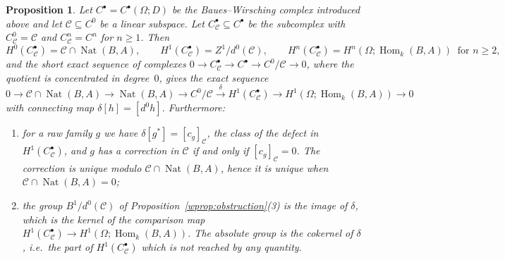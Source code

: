 \documentclass[11pt,a4paper]{article}
\theoremstyle{plain}
\newtheorem{proposition}[theorem]{Proposition}
\theoremstyle{definition}
\theoremstyle{remark}
\newcommand{\cat}[1]{\mathsf{#1}}
\newcommand{\catO}{\cat{\Omega}}
\DeclareMathOperator{\Nat}{Nat}
\DeclareMathOperator{\Hom}{Hom}
\begin{document}
\begin{proposition}\label{prop:relative}
Let $C^{\bullet} = C^{\bullet}(\catO;D)$ be the Baues--Wirsching complex
introduced above and let $\mathcal{C} \subseteq C^{0}$ be a linear subspace.
Let $C^{\bullet}_{\mathcal{C}} \subseteq C^{\bullet}$ be the subcomplex with
$C^{0}_{\mathcal{C}} = \mathcal{C}$ and $C^{n}_{\mathcal{C}} = C^{n}$ for
$n \ge 1$. Then
\[
H^{0}(C^{\bullet}_{\mathcal{C}}) = \mathcal{C} \cap \Nat(B,A),
\qquad
H^{1}(C^{\bullet}_{\mathcal{C}}) = Z^{1}/d^{0}(\mathcal{C}),
\qquad
H^{n}(C^{\bullet}_{\mathcal{C}}) = H^{n}(\catO;\Hom_k(B,A))
\ \text{ for } n \ge 2,
\]
and the short exact sequence of complexes
$0 \to C^{\bullet}_{\mathcal{C}} \to C^{\bullet} \to C^{0}/\mathcal{C} \to 0$,
where the quotient is concentrated in degree~$0$, gives the exact sequence
\begin{equation}\label{eq:relativeLES}
0 \to \mathcal{C} \cap \Nat(B,A) \to \Nat(B,A) \to C^{0}/\mathcal{C}
\xrightarrow{\ \delta\ } H^{1}(C^{\bullet}_{\mathcal{C}}) \to
H^{1}(\catO;\Hom_k(B,A)) \to 0
\end{equation}
with connecting map $\delta[h] = [d^{0}h]$. Furthermore:
\begin{enumerate}
\item for a raw family $g$ we have $\delta[g^{*}] = [c_g]_{\mathcal{C}}$, the
class of the defect in $H^{1}(C^{\bullet}_{\mathcal{C}})$, and $g$ has a
correction in $\mathcal{C}$ if and only if $[c_g]_{\mathcal{C}} = 0$. The
correction is unique modulo $\mathcal{C} \cap \Nat(B,A)$, hence it is unique
when $\mathcal{C} \cap \Nat(B,A) = 0$;
\item the group $B^{1}/d^{0}(\mathcal{C})$ of
Proposition~\ref{wprop:obstruction}(3) is the image of $\delta$, which is the
kernel of the comparison map
$H^{1}(C^{\bullet}_{\mathcal{C}}) \to H^{1}(\catO;\Hom_k(B,A))$. The absolute
group is the cokernel of $\delta$, i.e.\ the part of
$H^{1}(C^{\bullet}_{\mathcal{C}})$ which is not reached by any quantity.
\end{enumerate}
\end{proposition}
\end{document}
